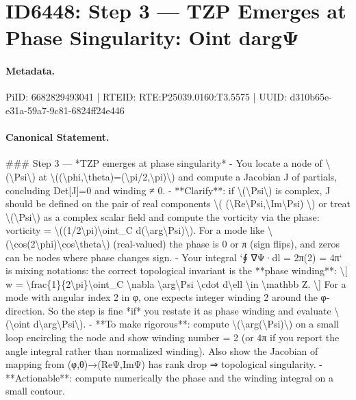 \section*{ID6448: Step 3 — TZP Emerges at Phase Singularity: Oint dargΨ}
\paragraph{Metadata.}
PiID: 6682829493041 | RTEID: RTE:P25039.0160:T3.5575 | UUID: d310b65e-e31a-59a7-9c81-6824ff24e446

\paragraph{Canonical Statement.}
\#\#\# Step 3 — *TZP emerges at phase singularity* - You locate a node of \textbackslash{}(\textbackslash{}Psi\textbackslash{}) at \textbackslash{}((\textbackslash{}phi,\textbackslash{}theta)=(\textbackslash{}pi/2,\textbackslash{}pi)\textbackslash{}) and compute a Jacobian J of partials, concluding Det[J]=0 and winding ≠ 0. - **Clarify**: if \textbackslash{}(\textbackslash{}Psi\textbackslash{}) is complex, J should be defined on the pair of real components \textbackslash{}( (\textbackslash{}Re\textbackslash{}Psi,\textbackslash{}Im\textbackslash{}Psi) \textbackslash{}) or treat \textbackslash{}(\textbackslash{}Psi\textbackslash{}) as a complex scalar field and compute the vorticity via the phase: vorticity = \textbackslash{}((1/2\textbackslash{}pi)\textbackslash{}oint\_C d(\textbackslash{}arg\textbackslash{}Psi)\textbackslash{}). For a mode like \textbackslash{}(\textbackslash{}cos(2\textbackslash{}phi)\textbackslash{}cos\textbackslash{}theta\textbackslash{}) (real-valued) the phase is 0 or π (sign flips), and zeros can be nodes where phase changes sign. - Your integral `∮ ∇Ψ·dl = 2π(2) = 4π` is mixing notations: the correct topological invariant is the **phase winding**: \textbackslash{}[ w = \textbackslash{}frac\{1\}\{2\textbackslash{}pi\}\textbackslash{}oint\_C \textbackslash{}nabla \textbackslash{}arg\textbackslash{}Psi \textbackslash{}cdot d\textbackslash{}ell \textbackslash{}in \textbackslash{}mathbb Z. \textbackslash{}] For a mode with angular index 2 in φ, one expects integer winding 2 around the φ-direction. So the step is fine *if* you restate it as phase winding and evaluate \textbackslash{}(\textbackslash{}oint d\textbackslash{}arg\textbackslash{}Psi\textbackslash{}). - **To make rigorous**: compute \textbackslash{}(\textbackslash{}arg(\textbackslash{}Psi)\textbackslash{}) on a small loop encircling the node and show winding number = 2 (or 4π if you report the angle integral rather than normalized winding). Also show the Jacobian of mapping from (φ,θ)→(ReΨ,ImΨ) has rank drop ⇒ topological singularity. - **Actionable**: compute numerically the phase and the winding integral on a small contour.

